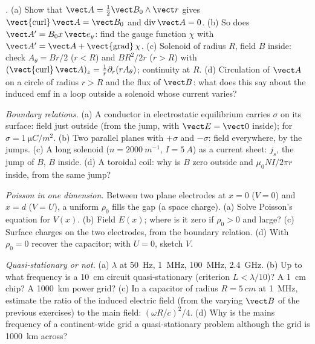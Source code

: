 \begin{exercise}[$\star\star$]\label{exo:b2:maxwell-equations:5}
\emph{.} (a) Show that $\vect A = \tfrac12\vect B_0\wedge\vect r$
gives $\operatorname{\vect{curl}}\vect A = \vect B_0$ and $\operatorname{div}\vect A = 0$.
(b) So does $\vect A' = B_0x\,\vect e_y$: find the gauge function $\chi$ with
$\vect A' = \vect A + \operatorname{\vect{grad}}\chi$. (c) Solenoid of radius $R$,
field $B$ inside: check $A_\theta = Br/2$ ($r < R$) and $BR^2/2r$ ($r > R$)
with $(\operatorname{\vect{curl}}\vect A)_z = \frac1r\partial_r(rA_\theta)$; continuity at $R$.
(d) Circulation of $\vect A$ on a circle of radius $r > R$ and the flux of
$\vect B$: what does this say about the induced emf in a loop outside a
solenoid whose current varies?
\end{exercise}

\begin{exercise}[$\star\star$]\label{exo:b2:maxwell-equations:6}
\emph{Boundary relations.} (a) A conductor in electrostatic
equilibrium carries $\sigma$ on its surface: field just outside (from the
jump, with $\vect E = \vect 0$ inside); for $\sigma = \qty{1}{\micro C/m^2}$. (b) Two
parallel planes with $+\sigma$ and $-\sigma$: field everywhere, by the jumps.
(c) A long solenoid ($n = \qty{2000}{m^{-1}}$, $I = \qty{5}{A}$) as a current
sheet: $j_s$, the jump of $B$, $B$ inside. (d) A toroidal coil: why is $B$
zero outside and $\mu_0NI/2\pi r$ inside, from the same jump?
\end{exercise}

\begin{exercise}[$\star\star$]\label{exo:b2:maxwell-equations:7}
\emph{Poisson in one dimension.} Between two plane electrodes at $x = 0$
($V = 0$) and $x = d$ ($V = U$), a uniform  $\rho_0$ fills the
gap (a space charge). (a) Solve Poisson's equation for $V(x)$. (b) Field
$E(x)$; where is it zero if $\rho_0 > 0$ and large? (c) Surface charges on
the two electrodes, from the boundary relation. (d) With $\rho_0 = 0$
recover the capacitor; with $U = 0$, sketch $V$.
\end{exercise}

\begin{exercise}[$\star\star$]\label{exo:b2:maxwell-equations:8}
\emph{Quasi-stationary or not.} (a) $\lambda$ at \qty{50}{Hz}, \qty{1}{MHz},
\qty{100}{MHz}, \qty{2.4}{GHz}. (b) Up to what frequency is a \qty{10}{cm}
circuit quasi-stationary (criterion $L < \lambda/10$)? A \qty{1}{cm} chip? A
\qty{1000}{km} power grid? (c) In a capacitor of radius $R = \qty{5}{cm}$ at
\qty{1}{MHz}, estimate the ratio of the induced electric field (from the
varying $\vect B$ of the previous exercises) to the main field: $(\omega R/c)^2
/4$. (d) Why is the mains frequency of a continent-wide grid a
quasi-stationary problem although the grid is \qty{1000}{km} across?
\end{exercise}

